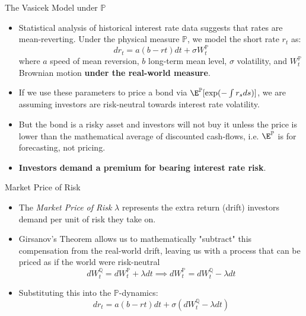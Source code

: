 \documentclass{beamer}
\begin{document}
\begin{frame}{The Vasicek Model under $\mathbb{P}$ }
	\begin{itemize}
		\item Statistical analysis of historical interest rate data suggests that rates are mean-reverting. Under the physical measure $\mathbb{P}$, we model the short rate $r_t$ as:
		\begin{equation*}
			dr_t = a(b-rt)dt + \sigma W_t^\mathbb{P}
		\end{equation*}
		where $a$ speed of mean reversion, $b$ long-term mean level, $\sigma$ volatility, and $W_t^\mathbb{P}$ Brownian motion \textbf{under the real-world measure}.
		\item If we use these parameters to price a bond via $\E^\mathbb{P}[\exp(-\int r_s ds)]$, we are assuming investors are risk-neutral towards interest rate volatility.
		\item But the bond is a risky asset and investors will not buy it unless the price is lower than the mathematical average of discounted cash-flows, i.e. $\E^\mathbb{P}$ is for forecasting, not pricing.
		\item \textbf{Investors demand a premium for bearing interest rate risk}.
	\end{itemize}
\end{frame}

\begin{frame}{Market Price of Risk}
	\begin{itemize}
		\item The \emph{Market Price of Risk} $\lambda$ represents the extra return (drift) investors demand per unit of risk they take on.
		\item Girsanov’s Theorem allows us to mathematically "subtract" this compensation from the real-world drift, leaving us with a process that can be priced as if the world were risk-neutral
		\begin{equation*}
			dW_t^\mathbb{Q} = dW_t^\mathbb{P} + \lambda dt \implies dW_t^\mathbb{P} = dW_t^\mathbb{Q} - \lambda dt
		\end{equation*}
		\item Substituting this into the $\mathbb{P}$-dynamics:
		\begin{equation*}
			dr_t = a(b-rt)dt + \sigma(dW_t^\mathbb{Q}-\lambda dt)
		\end{equation*}
		
	\end{itemize}
\end{frame}
\end{document}

